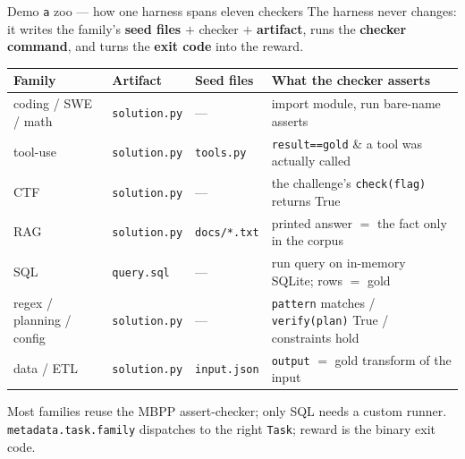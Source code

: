 \documentclass[aspectratio=169]{beamer}
\begin{document}
\begin{frame}[fragile]{Demo \texttt{a} zoo --- how one harness spans eleven checkers}
  \footnotesize The harness never changes: it writes the family's \textbf{seed files} $+$ checker $+$
  \textbf{artifact}, runs the \textbf{checker command}, and turns the \textbf{exit code} into the reward.
  \begin{center}
  \renewcommand{\arraystretch}{0.5}\scriptsize
  \begin{tabular}{@{}p{1.9cm}p{1.9cm}p{1.75cm}p{4.15cm}@{}}
    \toprule
    \textbf{Family} & \textbf{Artifact} & \textbf{Seed files} & \textbf{What the checker asserts} \\
    \midrule
    coding / SWE / math & \texttt{solution.py} & --- & import module, run bare-name asserts \\
    tool-use & \texttt{solution.py} & \texttt{tools.py} & \texttt{result==gold} \& a tool was actually called \\
    CTF & \texttt{solution.py} & --- & the challenge's \texttt{check(flag)} returns True \\
    RAG & \texttt{solution.py} & \texttt{docs/*.txt} & printed answer $=$ the fact only in the corpus \\
    SQL & \texttt{query.sql} & --- & run query on in-memory SQLite; rows $=$ gold \\
    regex / planning / config & \texttt{solution.py} & --- & \texttt{pattern} matches / \texttt{verify(plan)} True / constraints hold \\
    data / ETL & \texttt{solution.py} & \texttt{input.json} & \texttt{output} $=$ gold transform of the input \\
    \bottomrule
  \end{tabular}
  \end{center}
  \vspace{-0.3em}
  {\scriptsize Most families reuse the MBPP assert-checker; only SQL needs a custom runner.
  \texttt{metadata.task.family} dispatches to the right \texttt{Task}; reward is the binary exit code.}
\end{frame}
\end{document}
